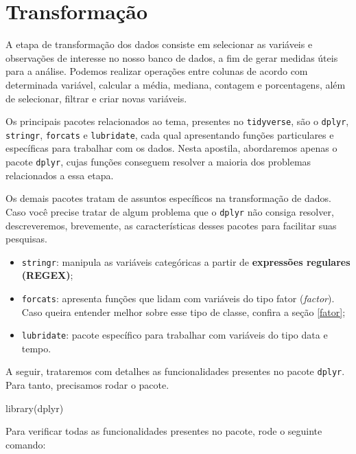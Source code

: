 \documentclass[
  brazilian,
]{book}
\newenvironment{Shaded}{\begin{snugshade}}{\end{snugshade}}
\newcommand{\FunctionTok}[1]{\textcolor[rgb]{0.00,0.00,0.00}{#1}}
\newcommand{\NormalTok}[1]{#1}
\begin{document}
\hypertarget{trans}{%
\chapter{Transformação}\label{trans}}

A etapa de transformação dos dados consiste em selecionar as variáveis e observações de interesse no nosso banco de dados, a fim de gerar medidas úteis para a análise. Podemos realizar operações entre colunas de acordo com determinada variável, calcular a média, mediana, contagem e porcentagens, além de selecionar, filtrar e criar novas variáveis.

Os principais pacotes relacionados ao tema, presentes no \texttt{tidyverse}, são o \texttt{dplyr}, \texttt{stringr}, \texttt{forcats} e \texttt{lubridate}, cada qual apresentando funções particulares e específicas para trabalhar com os dados. Nesta apostila, abordaremos apenas o pacote \texttt{dplyr}, cujas funções conseguem resolver a maioria dos problemas relacionados a essa etapa.

Os demais pacotes tratam de assuntos específicos na transformação de dados. Caso você precise tratar de algum problema que o \texttt{dplyr} não consiga resolver, descreveremos, brevemente, as características desses pacotes para facilitar suas pesquisas.

\begin{itemize}
\item
  \texttt{stringr}: manipula as variáveis categóricas a partir de \textbf{expressões regulares (REGEX)};
\item
  \texttt{forcats}: apresenta funções que lidam com variáveis do tipo fator (\emph{factor}). Caso queira entender melhor sobre esse tipo de classe, confira a seção \ref{fator};
\item
  \texttt{lubridate}: pacote específico para trabalhar com variáveis do tipo data e tempo.
\end{itemize}

A seguir, trataremos com detalhes as funcionalidades presentes no pacote \texttt{dplyr}. Para tanto, precisamos rodar o pacote.

\begin{Shaded}
\begin{Highlighting}[]
\FunctionTok{library}\NormalTok{(dplyr)}
\end{Highlighting}
\end{Shaded}

Para verificar todas as funcionalidades presentes no pacote, rode o seguinte comando:
\end{document}
